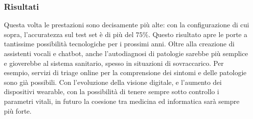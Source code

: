 \subsubsection{Risultati}
Questa volta le prestazioni sono decisamente più alte: con la configurazione di cui sopra, l'accuratezza sul test set è di più del $75\%$. Questo risultato apre le porte a tantissime possibilità tecnologiche per i prossimi anni. Oltre alla creazione di assistenti vocali e chatbot, anche l'autodiagnosi di patologie sarebbe più semplice e gioverebbe al sistema sanitario, spesso in situazioni di sovraccarico. Per esempio, servizi di triage online per la comprensione dei sintomi e delle patologie sono già possibili. Con l'evoluzione della visione digitale, e l'aumento dei dispositivi wearable, con la possibilità di tenere sempre sotto controllo i parametri vitali, in futuro la coesione tra medicina ed informatica sarà sempre più forte.